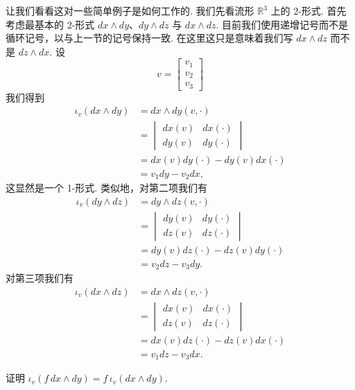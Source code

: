 让我们看看这对一些简单例子是如何工作的. 我们先看流形 $\mathbb{R}^3$ 上的 2-形式. 首先考虑最基本的 2-形式 $dx\wedge dy$、$dy\wedge dz$ 与 $dx\wedge dz$. 目前我们使用递增记号而不是循环记号，以与上一节的记号保持一致. 在这里这只是意味着我们写 $dx\wedge dz$ 而不是 $dz\wedge dx$. 设
\[
v=\begin{bmatrix}v_1\\v_2\\v_3\end{bmatrix}
\]
我们得到
\begin{align*}
\iota_v(dx\wedge dy)&=dx\wedge dy(v,\cdot)\\
&=\begin{vmatrix}
dx(v) & dx(\cdot)\\
dy(v) & dy(\cdot)
\end{vmatrix}\\
&=dx(v)dy(\cdot)-dy(v)dx(\cdot)\\
&=v_1dy-v_2dx,
\end{align*}
这显然是一个 1-形式. 类似地，对第二项我们有
\begin{align*}
\iota_v(dy\wedge dz)&=dy\wedge dz(v,\cdot)\\
&=\begin{vmatrix}
dy(v) & dy(\cdot)\\
dz(v) & dz(\cdot)
\end{vmatrix}\\
&=dy(v)dz(\cdot)-dz(v)dy(\cdot)\\
&=v_2dz-v_3dy.
\end{align*}
对第三项我们有
\begin{align*}
\iota_v(dx\wedge dz)&=dx\wedge dz(v,\cdot)\\
&=\begin{vmatrix}
dx(v) & dx(\cdot)\\
dz(v) & dz(\cdot)
\end{vmatrix}\\
&=dx(v)dz(\cdot)-dz(v)dx(\cdot)\\
&=v_1dz-v_3dx.
\end{align*}

\begin{question}\label{q:3-22}
证明 $\iota_v(f\,dx\wedge dy)=f\,\iota_v(dx\wedge dy)$.
\end{question}

